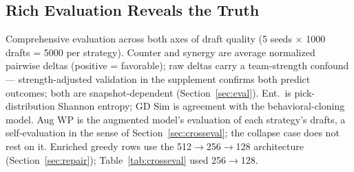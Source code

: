 \documentclass[journal]{IEEEtran}
\providecommand{\DIFdeltex}[1]{{\protect\color{red} \scriptsize #1}} %
\providecommand{\DIFdelbegin}{} %
\providecommand{\DIFdelFL}[1]{\DIFdel{#1}} %
\providecommand{\DIFdel}[1]{\texorpdfstring{\DIFdeltex{#1}}{}} %
\begin{document}
\DIFdelbegin \subsection{\DIFdel{Rich Evaluation Reveals the Truth}}
\addtocounter{subsection}{-1}%

{%
\DIFdelFL{Comprehensive evaluation across both axes of draft quality (5 seeds $\times$ 1000 drafts = 5000 per strategy). Counter and synergy are average normalized pairwise deltas (positive = favorable); raw deltas carry a team-strength confound — strength-adjusted validation in the supplement confirms both predict outcomes; both are snapshot-dependent (Section~\ref{sec:eval}). Ent.\ is pick-distribution Shannon entropy; GD Sim is agreement with the behavioral-cloning model. Aug WP is the augmented model's evaluation of each strategy's drafts, a self-evaluation in the sense of Section~\ref{sec:crosseval}; the collapse case does not rest on it. Enriched greedy rows use the 512$\to$256$\to$128 architecture (Section~\ref{sec:repair}); Table~\ref{tab:crosseval} used 256$\to$128.}}
\end{document}
